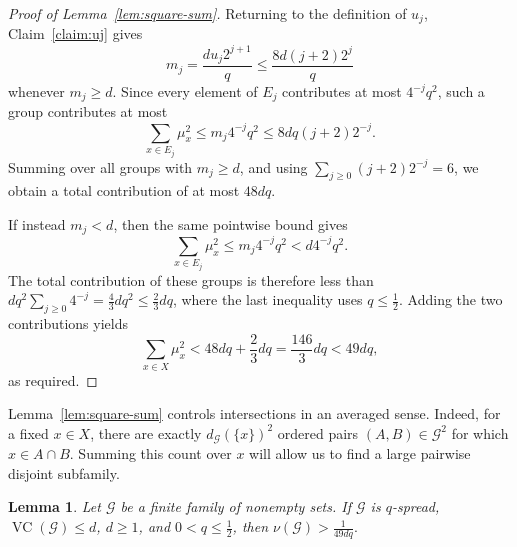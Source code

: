 \documentclass[11pt]{article}
\newtheorem{lemma}[theorem]{Lemma}
\theoremstyle{definition}
\newcommand{\cG}{\mathcal{G}}
\newcommand{\VC}{\operatorname{VC}}
\begin{document}
\begin{proof}[Proof of Lemma~\ref{lem:square-sum}]
Returning to the definition of \(u_{j}\), Claim~\ref{claim:uj} gives
\[
m_{j}=\frac{du_{j}2^{j+1}}{q}\le \frac{8d(j+2)2^{j}}{q}
\]
whenever \(m_{j}\ge d\). Since every element of \(E_{j}\) contributes at most \(4^{-j}q^{2}\), such a group contributes at most
\[
\sum_{x\in E_{j}}\mu_{x}^{2}\le m_{j}4^{-j}q^{2}\le 8dq(j+2)2^{-j}.
\]
Summing over all groups with \(m_{j}\ge d\), and using \(\sum_{j\ge 0}(j+2)2^{-j}=6\), we obtain a total contribution of at most \(48dq\).

If instead \(m_{j}<d\), then the same pointwise bound gives
\[
\sum_{x\in E_{j}}\mu_{x}^{2}\le m_{j}4^{-j}q^{2}<d4^{-j}q^{2}.
\]
The total contribution of these groups is therefore less than \(dq^{2}\sum_{j\ge 0}4^{-j}=\frac{4}{3}dq^{2}\le\frac{2}{3}dq\), where the last inequality uses \(q\le\frac{1}{2}\). Adding the two contributions yields
\[
\sum_{x\in X}\mu_{x}^{2}<48dq+\frac{2}{3}dq=\frac{146}{3}dq<49dq,
\]
as required.
\end{proof}

Lemma~\ref{lem:square-sum} controls intersections in an averaged sense. Indeed, for a fixed \(x\in X\), there are exactly \(d_{\cG}(\{x\})^{2}\) ordered pairs \((A,B)\in\cG^{2}\) for which \(x\in A\cap B\). Summing this count over \(x\) will allow us to find a large pairwise disjoint subfamily.

\begin{lemma}\label{lem:matching}
Let \(\cG\) be a finite family of nonempty sets. If \(\cG\) is \(q\)-spread, \(\VC(\cG)\le d\), \(d\ge 1\), and \(0<q\le\frac{1}{2}\), then
\(
\nu(\cG)>\frac{1}{49dq}.
\)
\end{lemma}
\end{document}
